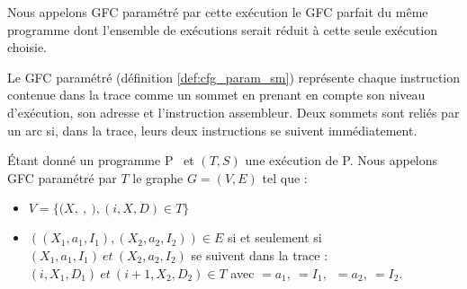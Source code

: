 Nous appelons GFC paramétré par cette exécution le GFC parfait du même programme dont l'ensemble de exécutions serait réduit à cette seule exécution choisie.
% 

Le GFC paramétré (définition \ref{def:cfg_param_sm}) représente chaque instruction contenue dans la trace comme un sommet en prenant en compte son niveau d'exécution, son adresse et l'instruction assembleur. Deux sommets sont reliés par un arc si, dans la trace, leurs deux instructions se suivent immédiatement.


\begin{defi}
 Étant donné un programme P \sm\ et $(T, S)$ une exécution de P.
 Nous appelons GFC paramétré par $T$ le graphe $G=(V, E)$ tel que :
 \begin{itemize}
  \item $V=\{(X,\ $$,\ $$), (i, X, D)\in T\}$%
  \item $((X_1, a_1, I_1), (X_2, a_2, I_2))\in E$ si et seulement si $(X_1, a_1,
I_1)\ et\ (X_2, a_2, I_2)$ se suivent dans la trace : $(i, X_1, D_1)\ et\ (i+1, X_2, D_2)\in T$ avec $=a_1,\ $$=I_1,$~$=a_2,\ $$=I_2$.
 \end{itemize}
\label{def:cfg_param_sm}
\end{defi}


